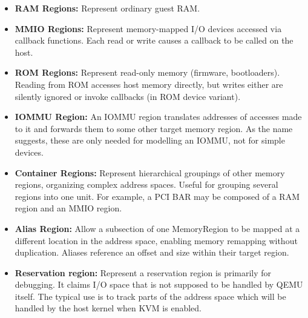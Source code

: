 \begin{itemize}
    \item \textbf{RAM Regions:          }
        Represent ordinary guest RAM.
    \item \textbf{MMIO Regions:         }
        Represent memory-mapped I/O devices accessed via callback functions. Each read or write causes a callback to be called on the host.  
    \item \textbf{ROM Regions:          }
        Represent read-only memory (firmware, bootloaders). Reading from ROM accesses host memory directly, but writes either are silently ignored or invoke callbacks (in ROM device variant).
    \item \textbf{IOMMU Region:         }
        An IOMMU region translates addresses of accesses made to it and forwards them to some other target memory region. As the name suggests, these are only needed for modelling an IOMMU, not for simple devices. 
    \item \textbf{Container Regions:    }
        Represent hierarchical groupings of other memory regions, organizing complex address spaces. Useful for grouping several regions into one unit. For example, a PCI BAR may be composed of a RAM region and an MMIO region.
    \item \textbf{Alias Region:         }
        Allow a subsection of one MemoryRegion to be mapped at a different location in the address space, enabling memory remapping without duplication. Aliases reference an offset and size within their target region.
    \item \textbf{Reservation region:   }
        Represent a reservation region is primarily for debugging. It claims I/O space that is not supposed to be handled by QEMU itself. The typical use is to track parts of the address space which will be handled by the host kernel when KVM is enabled.
\end{itemize}
